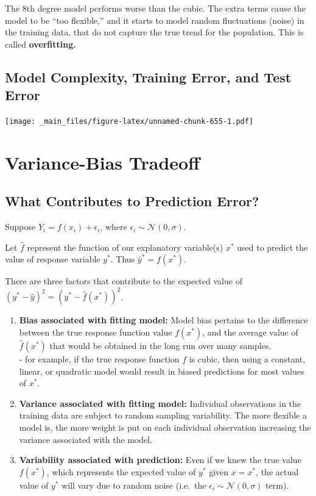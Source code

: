 \documentclass[]{book}
\begin{document}
The 8th degree model performs worse than the cubic. The extra terms
cause the model to be ``too flexible,'' and it starts to model random
fluctuations (noise) in the training data, that do not capture the true
trend for the population. This is called \textbf{overfitting.}

\subsection{Model Complexity, Training Error, and Test
Error}\label{model-complexity-training-error-and-test-error}

\texttt{[image: \_main\_files/figure-latex/unnamed-chunk-655-1.pdf]}

\section{Variance-Bias Tradeoff}\label{variance-bias-tradeoff}

\subsection{What Contributes to Prediction
Error?}\label{what-contributes-to-prediction-error}

Suppose \(Y_i = f(x_i) + \epsilon_i\), where
\(\epsilon_i\sim\mathcal{N}(0,\sigma)\).

Let \(\hat{f}\) represent the function of our explanatory variable(s)
\(x^*\) used to predict the value of response variable \(y^*\). Thus
\(\hat{y}^* = f(x^*)\).

There are three factors that contribute to the expected value of
\(\left(y^* - \hat{y}\right)^2 = \left(y^* - \hat{f}(x^*)\right)^2\).

\begin{enumerate}
\def\labelenumi{\arabic{enumi}.}
\item
  \textbf{Bias associated with fitting model:} Model bias pertains to
  the difference between the true response function value \(f(x^*)\),
  and the average value of \(\hat{f}(x^*)\) that would be obtained in
  the long run over many samples.\\
  - for example, if the true response function \(f\) is cubic, then
  using a constant, linear, or quadratic model would result in biased
  predictions for most values of \(x^*\).
\item
  \textbf{Variance associated with fitting model:} Individual
  observations in the training data are subject to random sampling
  variability. The more flexible a model is, the more weight is put on
  each individual observation increasing the variance associated with
  the model.
\item
  \textbf{Variability associated with prediction:} Even if we knew the
  true value \(f(x^*)\), which represents the expected value of \(y^*\)
  given \(x=x^*\), the actual value of \(y^*\) will vary due to random
  noise (i.e.~the \(\epsilon_i\sim\mathcal{N}(0,\sigma)\) term).
\end{enumerate}
\end{document}
